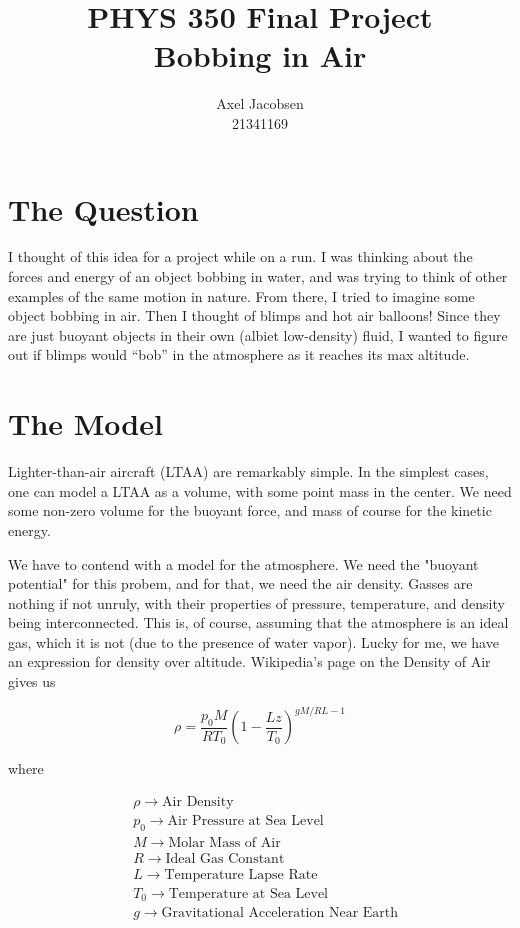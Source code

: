 \documentclass[titlepage]{article}
\begin{document}
\title{
    PHYS 350 Final Project \\
    \large Bobbing in Air
}
\author{Axel Jacobsen \\ 21341169}
\maketitle

\tableofcontents
\newpage

\section{The Question}

I thought of this idea for a project while on a run. I was thinking about the forces and energy of an object bobbing in water, and was trying to think of other examples of the same motion in nature. From there, I tried to imagine some object bobbing in air. Then I thought of blimps and hot air balloons! Since they are just buoyant objects in their own (albiet low-density) fluid, I wanted to figure out if blimps would ``bob'' in the atmosphere as it reaches its max altitude.

\section{The Model}

Lighter-than-air aircraft (LTAA) are remarkably simple. In the simplest cases, one can model a LTAA as a volume, with some point mass in the center. We need some non-zero volume for the buoyant force, and mass of course for the kinetic energy.
\vspace{8pt}

We have to contend with a model for the atmosphere. We need the "buoyant potential" for this probem, and for that, we need the air density. Gasses are nothing if not unruly, with their properties of pressure, temperature, and density being interconnected. This is, of course, assuming that the atmosphere is an ideal gas, which it is not (due to the presence of water vapor). Lucky for me, we have an expression for density over altitude. Wikipedia's page on the Density of Air\cite{density_eqn} gives us

\[
    \rho=\frac{p_{0} M}{R T_{0}}\left(1-\frac{L z}{T_{0}}\right)^{g M / R L-1}
\]

where

\[
     \begin{split}
        &\rho \rightarrow \text{Air Density} \\
        &p_0 \rightarrow \text{Air Pressure at Sea Level} \\
        &M \rightarrow \text{Molar Mass of Air} \\
        &R \rightarrow \text{Ideal Gas Constant} \\
        &L \rightarrow \text{Temperature Lapse Rate} \\
        &T_0 \rightarrow \text{Temperature at Sea Level} \\
        &g \rightarrow \text{Gravitational Acceleration Near Earth} \\
    \end{split}
\]
\end{document}
